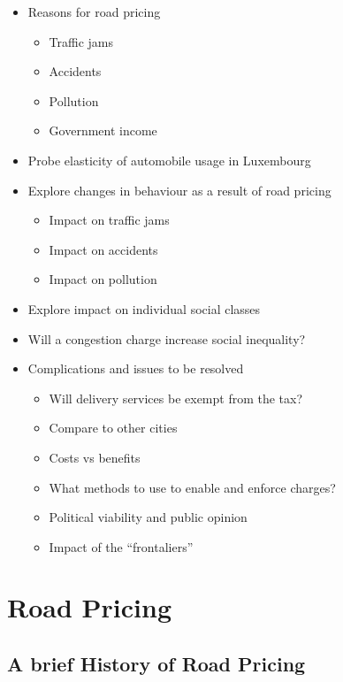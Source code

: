 \documentclass[
      a4paper,
        12pt,
          oneside,
      ]{article}
\providecommand{\tightlist}{
  \setlength{\itemsep}{0pt}
  \setlength{\parskip}{0pt}
}
\begin{document}
\begin{itemize}
\tightlist
\item
  Reasons for road pricing

  \begin{itemize}
  \tightlist
  \item
    Traffic jams
  \item
    Accidents
  \item
    Pollution
  \item
    Government income
  \end{itemize}
\item
  Probe elasticity of automobile usage in Luxembourg
\item
  Explore changes in behaviour as a result of road pricing

  \begin{itemize}
  \tightlist
  \item
    Impact on traffic jams
  \item
    Impact on accidents
  \item
    Impact on pollution
  \end{itemize}
\item
  Explore impact on individual social classes
\item
  Will a congestion charge increase social inequality?
\item
  Complications and issues to be resolved

  \begin{itemize}
  \tightlist
  \item
    Will delivery services be exempt from the tax?
  \item
    Compare to other cities
  \item
    Costs vs benefits
  \item
    What methods to use to enable and enforce charges?
  \item
    Political viability and public opinion
  \item
    Impact of the ``frontaliers''
  \end{itemize}
\end{itemize}

\hypertarget{road-pricing}{%
\section{Road Pricing}\label{road-pricing}}

\hypertarget{a-brief-history-of-road-pricing}{%
\subsection{A brief History of Road
Pricing}\label{a-brief-history-of-road-pricing}}
\end{document}
